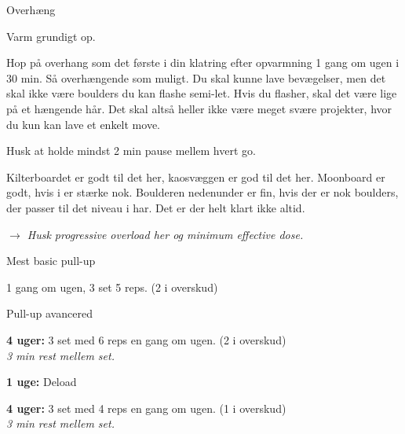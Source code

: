 
\begin{tList}{Overh\ae ng}
\item Varm grundigt op.

\item Hop på overhang som det første i din klatring
  efter opvarmning 1 gang om ugen i 30 min. Så overhængende
  som muligt. Du skal kunne lave bevægelser, men det skal ikke være
  boulders du kan flashe semi-let. Hvis du flasher, skal det være
  lige på et hængende hår. Det skal altså heller ikke være meget
  svære projekter, hvor du kun kan lave et enkelt move.

\item Husk at holde mindst 2 min pause mellem hvert go.
\end{tList}

Kilterboardet er godt til det her, kaosvæggen er god til det her.
Moonboard er godt, hvis i er stærke nok. Boulderen nedenunder er
fin, hvis der er nok boulders, der passer til det niveau i har. Det
er der helt klart ikke altid.

\emph{$\rightarrow$ Husk progressive overload her og minimum effective dose.}

\begin{tList}{Mest basic pull-up}
\item 1 gang om ugen, 3 set 5 reps. (2 i overskud)
\end{tList}

\begin{tList}{Pull-up avancered}
\item \textbf{4 uger:} 3 set med 6 reps en gang om ugen. (2 i overskud)\\
        \emph{3 min rest mellem set.}

\item \textbf{1 uge:} {\sc Deload}
\item \textbf{4 uger:} 3 set med 4 reps en gang om ugen. (1 i overskud)\\
        \emph{3 min rest mellem set.}
\end{tList}

